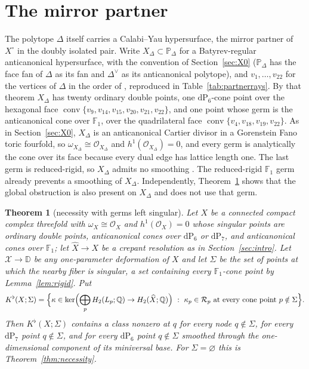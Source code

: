 \documentclass[11pt]{amsart}
\newtheorem{theorem}{Theorem}[section]
\theoremstyle{definition}
\theoremstyle{remark}
\theoremstyle{plain}
\newcommand{\QQ}{\mathbb{Q}}
\newcommand{\PP}{\mathbb{P}}
\newcommand{\cO}{\mathcal{O}}
\newcommand{\Rsm}{\mathcal{R}}   %
\newcommand{\cX}{\mathcal{X}}
\newcommand{\conv}{\operatorname{conv}}
\newcommand{\dP}{\mathrm{dP}}
\newcommand{\Xh}{\widehat{X}}
\newcommand{\Disk}{\mathbb{D}}
\begin{document}
\section{The mirror partner}\label{sec:partner}
The polytope $\Delta$ itself carries a Calabi--Yau hypersurface, the
mirror partner of $X^{\circ}$ in the doubly isolated pair.  Write
$X_{\Delta}\subset\PP_{\Delta}$ for a Batyrev-regular anticanonical
hypersurface, with the convention of Section~\ref{sec:X0} ($\PP_{\Delta}$ has
the face fan of $\Delta$ as its fan and $\Delta^{\vee}$ as its anticanonical
polytope), and $v_1,\dots,v_{22}$ for the vertices of $\Delta$ in
the order of \cite[Theorem~6.1]{PaperIII}, reproduced in
Table~\ref{tab:partnerrays}.  By that theorem $X_{\Delta}$ has twenty
ordinary double points, one $\dP_6$-cone point over the hexagonal face
$\conv\{v_9,v_{14},v_{15},v_{20},v_{21},v_{22}\}$, and one point whose
germ is the anticanonical cone over $\mathbb F_1$, over the
quadrilateral face $\conv\{v_4,v_{18},v_{19},v_{22}\}$.  As in
Section~\ref{sec:X0}, $X_{\Delta}$ is an anticanonical Cartier divisor
in a Gorenstein Fano toric fourfold, so
$\omega_{X_{\Delta}}\cong\cO_{X_{\Delta}}$ and
$h^1(\cO_{X_{\Delta}})=0$, and every germ is analytically the cone
over its face because every dual edge has lattice length one.  The
last germ
is reduced-rigid, so $X_{\Delta}$ admits no smoothing \cite{PaperI}.
The reduced-rigid $\mathbb F_1$ germ already prevents a smoothing of
$X_{\Delta}$.  Independently, Theorem~\ref{thm:partial} shows that the global
obstruction is also present on $X_{\Delta}$ and does not use that germ.

\begin{theorem}[necessity with germs left singular]\label{thm:partial}
Let $X$ be a connected compact complex threefold with $\omega_X\cong\cO_X$ and
$h^1(\cO_X)=0$ whose singular points are ordinary double points,
anticanonical cones over $\dP_6$ or $\dP_7$, and anticanonical cones
over $\mathbb F_1$; let $\Xh\to X$ be a crepant resolution as in
Section~\ref{sec:intro}.  Let $\cX\to\Disk$ be any one-parameter
deformation of $X$ and let $\Sigma$ be the set of points at which the
nearby fiber is singular, a set containing every $\mathbb F_1$-cone
point by Lemma~\ref{lem:rigid}.  Put
\[
K^{\flat}(X;\Sigma)=
\Bigl\{\kappa\in\ker\Bigl(\bigoplus_pH_2(L_p;\QQ)\to H_2(\Xh;\QQ)
\Bigr)\ :\ \kappa_p\in \Rsm_p\text{ at every cone point }p\notin\Sigma
\Bigr\}.
\]
Then $K^{\flat}(X;\Sigma)$ contains a class nonzero at $q$ for every
node $q\notin\Sigma$, for every $\dP_7$ point $q\notin\Sigma$, and for
every $\dP_6$ point $q\notin\Sigma$ smoothed through the one-dimensional
component of its miniversal base.  For $\Sigma=\varnothing$ this is
Theorem~\ref{thm:necessity}.
\end{theorem}
\end{document}
